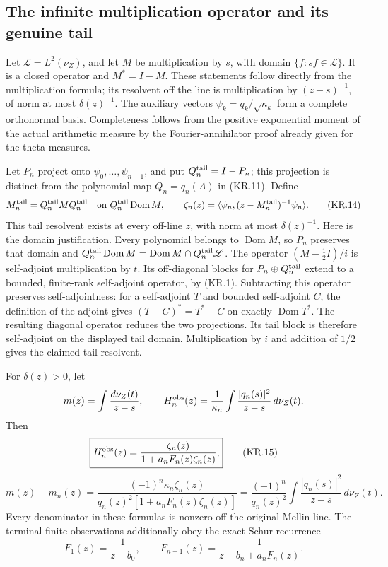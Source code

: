 \subsection{The infinite multiplication operator and its genuine tail}

Let \(\mathscr L=L^2(\nu_Z)\), and let \(M\) be multiplication by
\(s\), with domain \(\{f:sf\in\mathscr L\}\).  It is a closed
operator and \(M^*=I-M\).  These statements follow directly from
the multiplication formula; its resolvent off the line is
multiplication by \((z-s)^{-1}\), of norm at most
\(\delta(z)^{-1}\).  The auxiliary vectors
\(\psi_k=q_k/\sqrt{\kappa_k}\) form a complete orthonormal
basis.  Completeness follows from the positive exponential moment
of the actual arithmetic measure by the Fourier-annihilator proof
already given for the theta measures.

Let \(P_n\) project onto \(\psi_0,\ldots,\psi_{n-1}\), and put
\(Q_n^{\rm tail}=I-P_n\); this projection is distinct from the
polynomial map \(Q_n=q_n(A)\) in (KR.11).  Define
\[
 M_n^{\rm tail}=Q_n^{\rm tail}M Q_n^{\rm tail}
     \quad\hbox{on }Q_n^{\rm tail}\operatorname{Dom}M,
 \qquad
 \zeta_n(z)=\langle\psi_n,(z-M_n^{\rm tail})^{-1}\psi_n\rangle.
                                                               \tag{KR.14}
\]
This tail resolvent exists at every off-line \(z\), with norm at
most \(\delta(z)^{-1}\).  Here is the domain justification.
Every polynomial belongs to \(\operatorname{Dom}M\), so
\(P_n\) preserves that domain and
\(Q_n^{\rm tail}\operatorname{Dom}M
=\operatorname{Dom}M\cap Q_n^{\rm tail}\mathscr L\).
The operator \((M-\tfrac12I)/i\) is self-adjoint multiplication
by \(t\).  Its off-diagonal blocks for \(P_n\oplus Q_n^{\rm tail}\)
extend to a bounded, finite-rank self-adjoint operator, by (KR.1).
Subtracting this operator preserves self-adjointness: for a
self-adjoint \(T\) and bounded self-adjoint \(C\), the definition
of the adjoint gives \((T-C)^*=T^*-C\) on exactly
\(\operatorname{Dom}T^*\).  The resulting diagonal operator
reduces the two projections.  Its tail block is therefore
self-adjoint on the displayed tail domain.  Multiplication by
\(i\) and addition of \(1/2\) gives the claimed tail resolvent.

\begin{theorem}
For \(\delta(z)>0\), let
\[
 m(z)=\int\frac{d\nu_Z(t)}{z-s},\qquad
 H_n^{\rm obs}(z)=\frac1{\kappa_n}
                   \int\frac{|q_n(s)|^2}{z-s}\,d\nu_Z(t).
\]
Then
\[
 \boxed{H_n^{\rm obs}(z)
       =\frac{\zeta_n(z)}{1+a_nF_n(z)\zeta_n(z)},}         \tag{KR.15}
\]
\[
 \boxed{m(z)-m_n(z)
   =\frac{(-1)^n\kappa_n\zeta_n(z)}
       {q_n(z)^2[1+a_nF_n(z)\zeta_n(z)]}
   =\frac{(-1)^n}{q_n(z)^2}
                   \int\frac{|q_n(s)|^2}{z-s}\,d\nu_Z(t).} \tag{KR.16}
\]
Every denominator in these formulas is nonzero off the original
Mellin line.  The terminal finite observations additionally obey
the exact Schur recurrence
\[
 F_1(z)=\frac1{z-b_0},\qquad
 F_{n+1}(z)=\frac1{z-b_n+a_nF_n(z)}.                      \tag{KR.17}
\]
\end{theorem}

